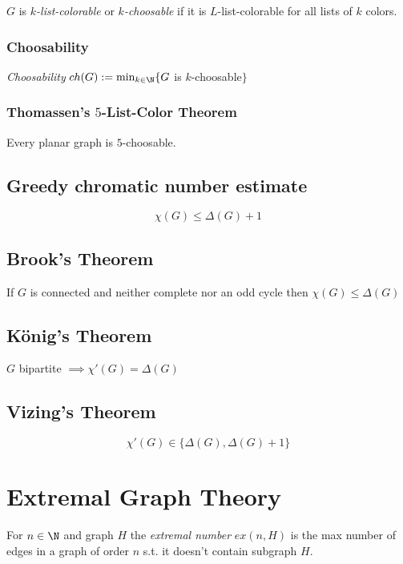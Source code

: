 \spacing

$G$ is \emph{$k$-list-colorable} or \emph{$k$-choosable} if it is $L$-list-colorable for all lists of $k$ colors.

\subsubsection*{Choosability}

\emph{Choosability} $ch(G) := \min_{k\in\N}\{ G$ is $k$-choosable$\}$

\subsubsection*{Thomassen's $5$-List-Color Theorem}

Every planar graph is $5$-choosable.

\subsection*{Greedy chromatic number estimate}

$$\chi(G) \leq \Delta(G)+1$$

\subsection*{Brook's Theorem}

If $G$ is connected and neither complete nor an odd cycle then $\chi(G) \leq \Delta(G)$

\subsection*{König's Theorem}

$G$ bipartite $\implies \chi'(G) = \Delta(G)$

\subsection*{Vizing's Theorem}

$$\chi'(G) \in \{\Delta(G), \Delta(G)+1\}$$

\section*{Extremal Graph Theory}

For $n \in \N$ and graph $H$ the \emph{extremal number} $ex(n,H)$ is the max number of edges in a graph of order $n$ s.t. it doesn't contain subgraph $H$.

